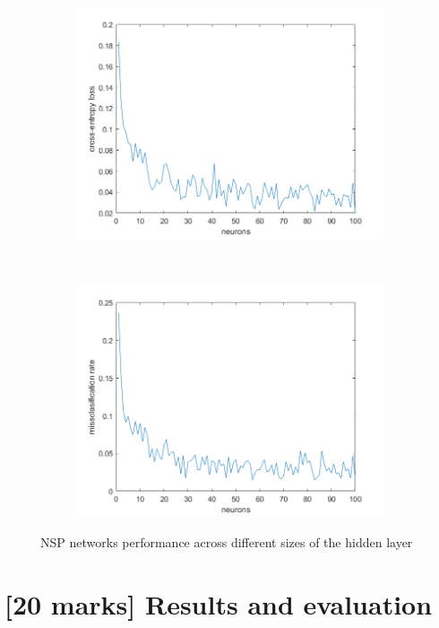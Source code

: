 \documentclass[11pt,a4paper]{article}
\begin{document}
\begin{figure}[htb]
  \centering
  \begin{subfigure}[b]{0.45\textwidth}
    \centering
    \includegraphics[width=\textwidth]{figures/delta_ce_nsp.png}
  \end{subfigure}
  ~
  \begin{subfigure}[b]{0.45\textwidth}
    \centering
    \includegraphics[width=\textwidth]{figures/delta_misclass_rate_nsp.png}
  \end{subfigure}
  \caption{NSP networks performance across different sizes of the hidden layer}
  \label{fig:NSP_performance}
\end{figure}


\section{[20 marks] Results and evaluation}
\label{sec:results}
\end{document}
